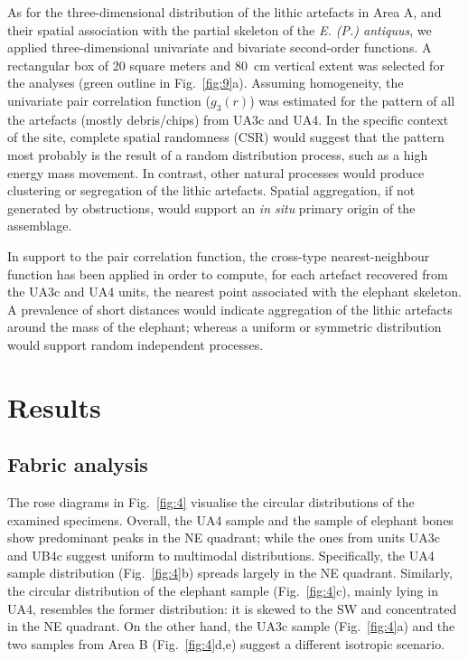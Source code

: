 \documentclass[review,authoryear,times]{elsarticle} %
\begin{document}
As for the three-dimensional distribution of the lithic artefacts in Area A, and their spatial association with the partial skeleton of the \emph{E. (P.) antiquus}, we applied three-dimensional univariate and bivariate second-order functions. A rectangular box of 20 square meters and 80~cm vertical extent was selected for the analyses (green outline in Fig.~\ref{fig:9}a). Assuming homogeneity, the univariate pair correlation function ($g_3(r)$) was estimated for the pattern of all the artefacts (mostly debris/chips) from UA3c and UA4. In the specific context of the site, complete spatial randomness (CSR) would suggest that the pattern most probably is the result of a random distribution process, such as a high energy mass movement. In contrast, other natural processes would produce clustering or segregation of the lithic artefacts. Spatial aggregation, if not generated by obstructions, would support an \emph{in situ} primary origin of the assemblage.

In support to the pair correlation function, the cross-type nearest-neighbour function has been applied in order to compute, for each artefact recovered from the UA3c and UA4 units, the nearest point associated with the elephant skeleton. A prevalence of short distances would indicate aggregation of the lithic artefacts around the mass of the elephant; whereas a uniform or symmetric distribution would support random independent processes.

\section{Results}

\subsection{Fabric analysis}


The rose diagrams in Fig.~\ref{fig:4} visualise the circular distributions of the examined specimens. Overall, the UA4 sample and the sample of elephant bones show predominant peaks in the NE quadrant; while the ones from units UA3c and UB4c suggest uniform to multimodal distributions. Specifically, the UA4 sample distribution (Fig.~\ref{fig:4}b) spreads largely in the NE quadrant. Similarly, the circular distribution of the elephant sample (Fig.~\ref{fig:4}c), mainly lying in UA4, resembles the former distribution: it is skewed to the SW and concentrated in the NE quadrant. On the other hand, the UA3c sample (Fig.~\ref{fig:4}a) and the two samples from Area B (Fig.~\ref{fig:4}d,e) suggest a different isotropic scenario.
\end{document}

